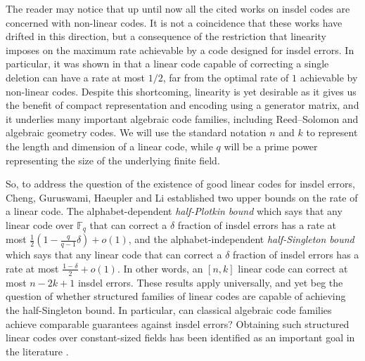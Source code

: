 \documentclass[draft, onecolumn, 11pt]{IEEEtran}
\newcommand{\F}{\mathbb{F}}
\begin{document}
The reader may notice that up until now all the cited works on insdel codes are concerned with non-linear codes. It is not a coincidence that these works have drifted in this direction, but a consequence of the restriction that linearity imposes on the maximum rate achievable by a code designed for insdel errors. In particular, it was shown in \cite{abdel2007linear} that a linear code capable of correcting a single deletion can have a rate at most $1/2$, far from the optimal rate of $1$ achievable by non-linear codes. Despite this shortcoming, linearity is yet desirable as it gives us the benefit of compact representation and encoding using a generator matrix, and it underlies many important algebraic code families, including Reed--Solomon and algebraic geometry codes. We will use the standard notation $n$ and $k$ to represent the length and dimension of a linear code, while $q$ will be a prime power representing the size of the underlying finite field.

So, to address the question of the existence of good linear codes for insdel errors, Cheng, Guruswami, Haeupler and Li \cite{cheng2020efficient} established two upper bounds on the rate of a linear code. The alphabet-dependent \emph{half-Plotkin bound} which says that any linear code over $\F_q$ that can correct a $\delta$ fraction of insdel errors has a rate at most $\frac{1}{2}\left(1 - \frac{q}{q-1}\delta\right) + o(1)$, and the alphabet-independent \emph{half-Singleton bound} which says that any linear code that can correct a $\delta$ fraction of insdel errors has a rate at most $\frac{1-\delta}{2}+o(1)$. In other words, an $[n,k]$ linear code can correct at most $n-2k+1$ insdel errors. 
These results apply universally, and yet beg the question of whether structured families of linear codes are capable of achieving the half-Singleton bound. In particular, can classical algebraic code families achieve comparable guarantees against insdel errors? Obtaining such structured linear codes over constant-sized fields has been identified as an important goal in the literature \cite{cheng2023linear}.
\end{document}
